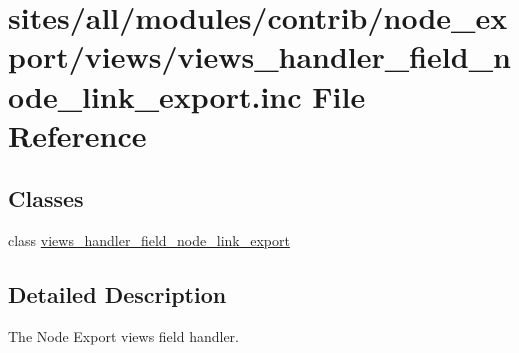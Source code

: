 \hypertarget{views__handler__field__node__link__export_8inc}{
\section{sites/all/modules/contrib/node\_\-export/views/views\_\-handler\_\-field\_\-node\_\-link\_\-export.inc File Reference}
\label{views__handler__field__node__link__export_8inc}
}
\subsection*{Classes}
\begin{CompactItemize}
\item 
class \hyperlink{classviews__handler__field__node__link__export}{views\_\-handler\_\-field\_\-node\_\-link\_\-export}
\end{CompactItemize}


\subsection{Detailed Description}
The Node Export views field handler. 